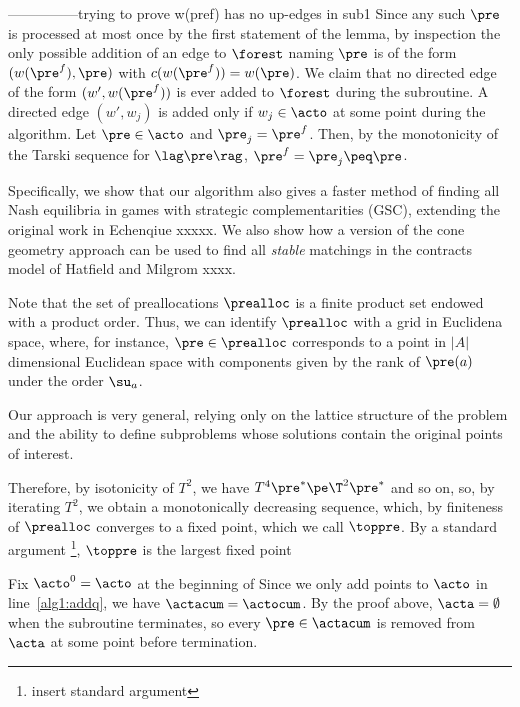 


---------------trying to prove w(pref) has no up-edges in sub1 
Since any such $\pre$ is processed at most once by the first statement of the lemma, by inspection the only possible addition of an edge to $\forest$ naming $\pre$ is of the form $(w(\pre^f),\pre)$ with $c(w(\pre^f)) = w(\pre)$.  
We claim that no directed edge of the form $(w', w(\pre^f))$ is ever added to $\forest$ during the subroutine. 
A directed edge $(w',w_j)$ is added only if $w_j \in \acto$ at some point during the algorithm. 
Let $\pre \in \acto$ and $\pre_j = \pre^f$. 
Then, by the monotonicity of the Tarski sequence for $\lag \pre \rag$, $\pre^f = \pre_j \peq \pre$.

Specifically, we show that our algorithm also gives a faster method of finding all Nash equilibria in games with strategic complementarities (GSC), extending the original work in Echenqiue xxxxx.  
We also show how a version of the cone geometry approach can be used to find all \emph{stable} matchings in the contracts model of Hatfield and Milgrom xxxx.  

Note that the set of preallocations $\prealloc$ is a finite product set endowed with a product order.
Thus, we can identify $\prealloc$ with a grid in Euclidena space, where, for instance, $\pre \in \prealloc$ corresponds to a point in $|A|$ dimensional Euclidean space with components given by the rank of $\pre(a)$ under the order $\su_a$. 

Our approach is very general, relying only on the lattice structure of the problem and the ability to define subproblems whose solutions contain the original points of interest.  

Therefore, by isotonicity of $T^2$, we have $T^4 \pre^* \pe \T^2 \pre^*$ and so on, so, by iterating $T^2$, we obtain a monotonically decreasing sequence, which, by finiteness of $\prealloc$ converges to a fixed point, which we call $\toppre$.
By a standard argument \footnote{insert standard argument}, $\toppre$ is the largest fixed point 

Fix $\acto^{0} = \acto$ at the beginning of 
Since we only add points to $\acto$ in line~\ref{alg1:addq}, we have $\actacum = \actocum$. 
By the proof above, $\acta = \emptyset$ when the subroutine terminates, so every $\pre \in \actacum$ is removed from $\acta$ at some point before termination.



